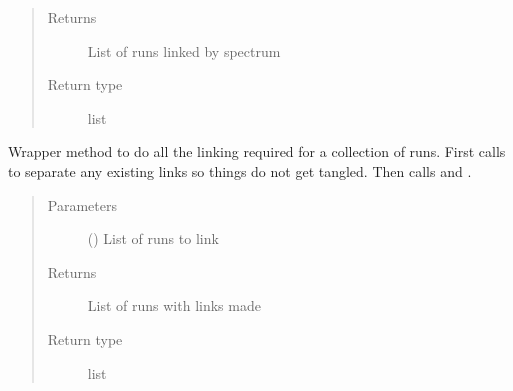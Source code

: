 \documentclass[letterpaper,10pt,english]{sphinxmanual}
\begin{document}
\begin{fulllineitems}
\begin{fulllineitems}
\begin{quote}
\begin{description}
\item[{Returns}] \leavevmode
List of runs linked by spectrum

\item[{Return type}] \leavevmode
list

\end{description}\end{quote}

\end{fulllineitems}


\begin{fulllineitems}
\label{\detokenize{polo.utils:polo.utils.io_utils.RunLinker.the_big_link}}
Wrapper method to do all the linking required for a collection of
runs. First calls {\hyperref[\detokenize{polo.utils:polo.utils.io_utils.RunLinker.unlink_runs_completely}]{}}
to separate any existing links so things do not get tangled. Then 
calls {\hyperref[\detokenize{polo.utils:polo.utils.io_utils.RunLinker.link_runs_by_date}]{}} and
{\hyperref[\detokenize{polo.utils:polo.utils.io_utils.RunLinker.link_runs_by_spectrum}]{}}.
\begin{quote}\begin{description}
\item[{Parameters}] \leavevmode
{} () \textendash{} List of runs to link

\item[{Returns}] \leavevmode
List of runs with links made

\item[{Return type}] \leavevmode
list

\end{description}\end{quote}

\end{fulllineitems}



\end{fulllineitems}
\end{document}
